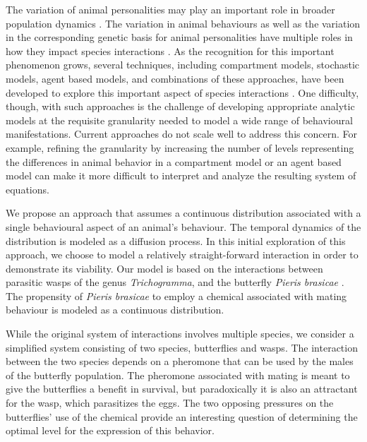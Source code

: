 \documentclass[review,authoryear]{elsarticle}
\begin{document}
The variation of animal personalities may play an important role in broader population dynamics \citep{doi:10.1111/j.1461-0248.2010.01536.x}.  The variation in animal behaviours as well as the variation in the corresponding genetic basis for animal personalities have multiple roles in how they impact species interactions \citep{doi:10.1111/j.1461-0248.2010.01536.x,doi:10.1086/687235,mierzejewski_horn_luong_2019,SANTICCHIA20191,doi:10.1098/rspb.2014.1016,FARINE2015609,sibbald2009individual,kurvers2011effect,modlmeier2012diverse,doi:10.1037/0735-7036.107.3.250}.  As the recognition for this important phenomenon grows, several techniques,  including compartment models, stochastic
models, agent based models, and combinations of these
approaches, have been developed to explore this important aspect of species interactions  \citep{Keeling65,doi:10.1086/687235,doi:10.1098/rspb.2001.1599,SuperspreadingLloyd}.  One difficulty, though, with such approaches is the
challenge of developing appropriate analytic models at the requisite granularity needed to model a wide range of behavioural manifestations. Current approaches do not scale well to address this concern. For example, refining the granularity by increasing the number of levels representing the differences in animal behavior in a compartment model or an agent based model can make it more difficult to interpret and analyze the resulting system of equations. 

We propose an approach that assumes a continuous distribution
associated with a single behavioural aspect of an animal's behaviour. The temporal dynamics of the distribution is modeled as a diffusion process. In
this initial exploration of this approach, we choose to model a relatively
straight-forward interaction in order to demonstrate its viability. Our model is based on
the interactions between parasitic wasps of the genus
\textit{Trichogramma}, and the butterfly \textit{Pieris
  brasicae} \citep{10.1093/beheco/arq007}.  The propensity of
\textit{Pieris brasicae} to employ a chemical associated with mating
behaviour is modeled as a continuous distribution.

While the original system of interactions involves multiple species, we consider a simplified system consisting of two
species, butterflies and wasps.  The interaction between the two species depends on a pheromone that can be used by the males of the butterfly population. The pheromone associated with mating is meant to give the butterflies a benefit in survival, but paradoxically it is also an attractant for the wasp, which parasitizes the eggs. The two opposing pressures on the butterflies' use of the chemical provide an interesting question of determining the optimal level for the expression of this behavior.
\end{document}
